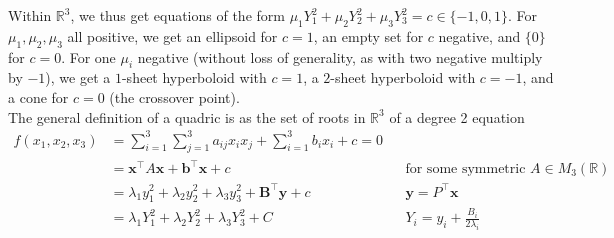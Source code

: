\documentclass{tikzposter} %
\begin{document}
\begin{columns}
{{    Within $\mathbb{R}^{3}$, we thus get equations of the form $\mu_{1} Y_{1}^{2} + \mu_{2} Y_{2}^{2} + \mu_{3}Y_{3}^{2} = c \in \{-1, 0, 1\}$. For $\mu_{1}, \mu_{2}, \mu_{3}$ all positive, we get an ellipsoid for $c = 1$, an empty set for $c$ negative, and $\{0\}$ for $c = 0$. For one $\mu_{i}$ negative (without loss of generality, as with two negative multiply by $-1$), we get a $1$-sheet hyperboloid with $c = 1$, a $2$-sheet hyperboloid with $c = -1$, and a cone for $c = 0$ (the crossover point). \\

    The general definition of a quadric is as the set of roots in $\mathbb{R}^{3}$ of a degree 2 equation
    \begin{align*}
      f(x_{1}, x_{2}, x_{3}) &= \sum_{i = 1}^{3} \sum_{j=1}^{3} a_{ij}x_{i}x_{j} + \sum_{i=1}^{3} b_{i}x_{i} + c = 0 \\
                            &= \bm{x}^{\top} A \bm{x} + \bm{b}^{\top} \bm{x} + c && \text{for some symmetric } A \in M_{3}(\mathbb{R}) \\
                            &= \lambda_{1}y_{1}^{2} + \lambda_{2} y_{2}^{2} + \lambda_{3} y_{3}^{2} + \bm{B}^{\top}\bm{y} + c && \bm{y} = P^{\top}\bm{x} \\
                            &= \lambda_{1}Y_{1}^{2} + \lambda_{2} Y_{2}^{2} + \lambda_{3} Y_{3}^{2} + C && Y_{i} = y_{i} + \frac{B_{i}}{2\lambda_{i}}
    \end{align*}
  }
}
\end{columns}
\end{document}

